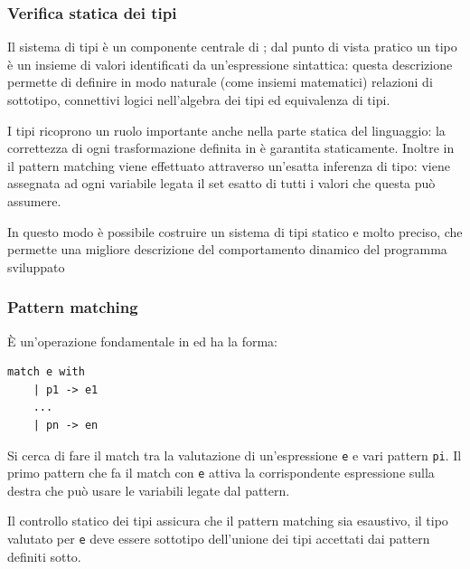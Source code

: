 \subsubsection{Verifica statica dei tipi}
Il sistema di tipi è un componente centrale di \cduce; dal punto di vista pratico un tipo è un insieme di valori identificati da un'espressione sintattica: questa descrizione permette di definire in modo naturale (come insiemi matematici) relazioni di sottotipo, connettivi logici nell'algebra dei tipi ed equivalenza di tipi.

I tipi ricoprono un ruolo importante anche nella parte statica del linguaggio: la correttezza di ogni trasformazione definita in \cduce è garantita staticamente. Inoltre in \cduce il pattern matching viene effettuato attraverso un'esatta inferenza di tipo: viene assegnata ad ogni variabile legata il set esatto di tutti i valori che questa può assumere.

In questo modo è possibile costruire un sistema di tipi statico e molto preciso, che permette una migliore descrizione del comportamento dinamico del programma sviluppato
\subsubsection{Pattern matching}
\label{CDucePattern}
È un'operazione fondamentale in \cduce ed ha la forma:
\begin{verbatim}
match e with
	| p1 -> e1
	...
	| pn -> en
\end{verbatim}
Si cerca di fare il match tra la valutazione di un'espressione \verb|e| e vari pattern \verb|pi|. Il primo pattern che fa il match con \verb|e| attiva la corrispondente espressione sulla destra che può usare le variabili legate dal pattern.

Il controllo statico dei tipi assicura che il pattern matching sia esaustivo, il tipo valutato per \verb|e| deve essere sottotipo dell'unione dei tipi accettati dai pattern definiti sotto.
